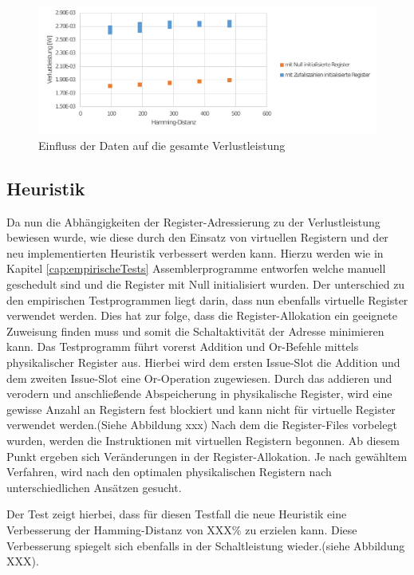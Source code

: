 \begin{figure}[H]
	\centering
	\includegraphics[width=\textwidth]{fig/random_data_total_power.pdf}
	\caption{Einfluss der Daten auf die gesamte Verlustleistung}
	\label{fig:random_data_total_power}
\end{figure}


\subsection{Heuristik} 
Da nun die Abhängigkeiten der Register-Adressierung zu der Verlustleistung bewiesen wurde, wie diese durch den Einsatz von virtuellen Registern und der neu implementierten Heuristik verbessert werden kann. Hierzu werden wie in Kapitel \ref{cap:empirischeTests} Assemblerprogramme entworfen welche manuell geschedult sind und die Register mit Null initialisiert wurden. Der unterschied zu den empirischen Testprogrammen liegt darin, dass nun ebenfalls virtuelle Register verwendet werden.
Dies hat zur folge, dass die Register-Allokation ein geeignete Zuweisung finden muss und somit die Schaltaktivität der Adresse minimieren kann. Das Testprogramm führt vorerst Addition und Or-Befehle mittels physikalischer Register aus. Hierbei wird dem ersten Issue-Slot die Addition und dem zweiten Issue-Slot eine Or-Operation zugewiesen. Durch das addieren und verodern und anschließende Abspeicherung in physikalische Register, wird eine gewisse Anzahl an Registern fest blockiert und kann nicht für virtuelle Register verwendet werden.(Siehe Abbildung xxx)
Nach dem die Register-Files vorbelegt wurden, werden die Instruktionen mit virtuellen Registern begonnen. Ab diesem Punkt ergeben sich Veränderungen in der Register-Allokation. Je nach gewähltem Verfahren, wird nach den optimalen physikalischen Registern nach unterschiedlichen Ansätzen gesucht. 

Der Test zeigt hierbei, dass für diesen Testfall die neue Heuristik eine Verbesserung der Hamming-Distanz von XXX\% zu erzielen kann. Diese Verbesserung spiegelt sich ebenfalls in der Schaltleistung wieder.(siehe Abbildung XXX).

